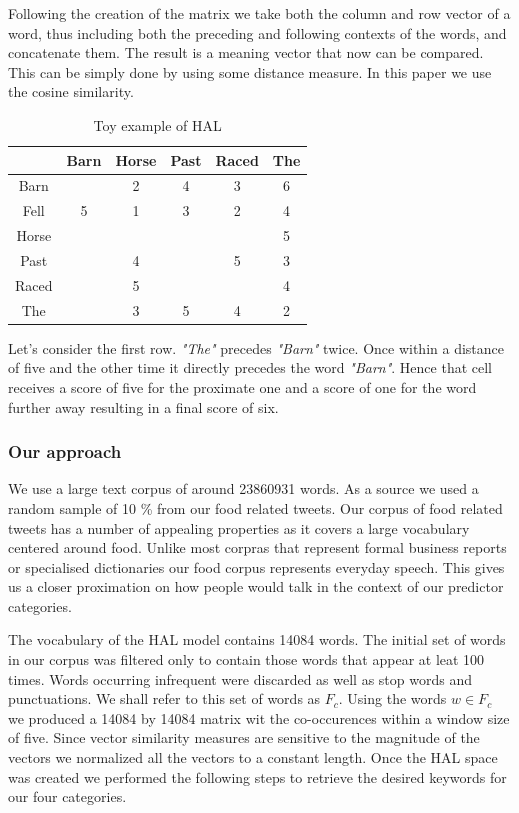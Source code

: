 \documentclass[12pt]{report}
\begin{document}
Following the creation of the matrix we take both the column and row vector of a word, thus including both the preceding and following contexts of the words, and concatenate them. The result is a meaning vector that now can be compared. This can be simply done by using some distance measure. In this paper we use the cosine similarity. 

\begin{table}[h]
\centering
\begin{tabular}{ c c c c c c} \toprule
  & Barn & Horse &  Past & Raced & The \\ 
  \hline
 Barn &  & 2 &  4 & 3 & 6 \\ 
 Fell & 5 & 1 &  3 & 2 & 4 \\ 
 Horse &  &  &   &  & 5 \\ 
 Past &  & 4 &   & 5 & 3 \\ 
 Raced &  & 5 &   &  & 4 \\ 
 The &  & 3 &  5 & 4 & 2 \\ 
   \bottomrule
\end{tabular}
\caption{Toy example of HAL}
\label{tab:halex}
\end{table}

Let's consider the first row.  \emph{"The"} precedes \emph{"Barn"} twice. Once within a distance of five and the other time it directly precedes the word  \emph{"Barn"}. Hence that cell receives a score of five for the proximate one and a score of one for the word further away resulting in a final score of six. 


\subsubsection{Our approach}

We use a large text corpus of around 23860931 words. As a source we used a random sample of 10 \% from our food related tweets. Our corpus of food related tweets has a number of appealing properties as it covers a large vocabulary centered around food. Unlike most corpras that represent formal business reports or specialised dictionaries our food corpus represents everyday speech. This gives us a closer proximation on how people would talk in the context of our predictor categories. 

The vocabulary of the HAL model contains 14084 words. The initial set of words in our corpus was filtered only to contain those words that appear at leat 100 times. Words occurring infrequent were discarded as well as stop words and punctuations. We shall refer to this set of words as $F_c$. Using the words $w \in F_c$ we produced a 14084 by 14084 matrix wit the co-occurences within a window size of five. Since vector similarity measures are sensitive to the magnitude of the vectors we normalized all the vectors to a constant length. Once the HAL space was created we performed the following steps to retrieve the desired keywords for our four categories. 
\end{document}
